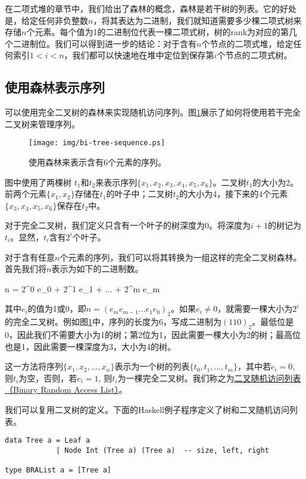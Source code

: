\documentclass[UTF8]{article}
\begin{document}
在二项式堆的章节中，我们给出了森林的概念，森林是若干树的列表。它的好处是，给定任何非负整数$n$，将其表达为二进制，我们就知道需要多少棵二项式树来存储$n$个元素。每个值为1的二进制位代表一棵二项式树，树的rank为对应的第几个二进制位。我们可以得到进一步的结论：对于含有$n$个节点的二项式堆，给定任何索引$1 < i < n$，我们都可以快速地在堆中定位到保存第$i$个节点的二项式树。

\subsection{使用森林表示序列}

可以使用完全二叉树的森林来实现随机访问序列。图\ref{fig:bi-tree-sequence}展示了如何将使用若干完全二叉树来管理序列。

\begin{figure}[htbp]
  \centering
  \texttt{[image: img/bi-tree-sequence.ps]}
  \caption{使用森林来表示含有6个元素的序列。} \label{fig:bi-tree-sequence}
\end{figure}

图中使用了两棵树 $t_1$和$t_2$来表示序列$\{x_1, x_2, x_3, x_4, x_5, x_6\}$。二叉树$t_1$的大小为2。前两个元素$\{x_1, x_2\}$存储在$t_1$的叶子中；二叉树$t_2$的大小为4，接下来的4个元素$\{x_3, x_4, x_5, x_6\}$保存在$t_2$中。

对于完全二叉树，我们定义只含有一个叶子的树深度为0。将深度为$i+1$的树记为$t_i$。显然，$t_i$含有$2^i$个叶子。

对于含有任意$n$个元素的序列，我们可以将其转换为一组这样的完全二叉树森林。首先我们将$n$表示为如下的二进制数。

\be
n = 2^0 e_0 + 2^1 e_1 + ... + 2^m e_m
\ee

其中$e_i$的值为1或0，即$n=(e_m e_{m-1} ... e_1 e_0)_2$。如果$e_i \neq 0$，就需要一棵大小为$2^i$的完全二叉树。例如图\ref{fig:bi-tree-sequence}中，序列的长度为6，写成二进制为$(110)_2$。最低位是0，因此我们不需要大小为1的树；第2位为1，因此需要一棵大小为2的树；最高位也是1，因此需要一棵深度为3，大小为4的树。

这一方法将序列$\{x_1, x_2, ..., x_n\}$表示为一个树的列表$\{t_0, t_1, ..., t_m\}$，其中若$e_i = 0$, 则$t_i$为空，否则，若$e_i = 1$, 则$t_i$为一棵完全二叉树。我们称之为\underline{二叉随机访问列表（Binary Random Access List）}\cite{okasaki-book}。

我们可以复用二叉树的定义。下面的Haskell例子程序定义了树和二叉随机访问列表。

\lstset{language=Haskell}
\begin{lstlisting}
data Tree a = Leaf a
            | Node Int (Tree a) (Tree a)  -- size, left, right

type BRAList a = [Tree a]
\end{lstlisting}
\end{document}
